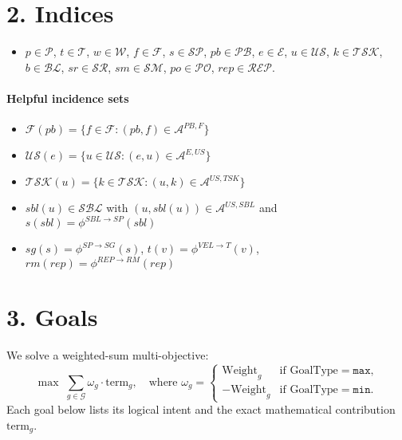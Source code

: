 \documentclass[11pt,a4paper]{article}
\begin{document}
\section{2. Indices}
\begin{itemize}[leftmargin=2.2em]
  \item $p\in\mathcal{P}$, $t\in\mathcal{T}$, $w\in\mathcal{W}$, $f\in\mathcal{F}$, $s\in\mathcal{SP}$, $pb\in\mathcal{PB}$, $e\in\mathcal{E}$, $u\in\mathcal{US}$, $k\in\mathcal{TSK}$, $b\in\mathcal{BL}$, $sr\in\mathcal{SR}$, $sm\in\mathcal{SM}$, $po\in\mathcal{PO}$, $rep\in\mathcal{REP}$.
\end{itemize}

\paragraph{Helpful incidence sets}
\begin{itemize}[leftmargin=2.2em]
  \item $\mathcal{F}(pb)=\{f\in\mathcal{F}:(pb,f)\in\mathcal{A}^{PB,F}\}$
  \item $\mathcal{US}(e)=\{u\in\mathcal{US}:(e,u)\in\mathcal{A}^{E,US}\}$
  \item $\mathcal{TSK}(u)=\{k\in\mathcal{TSK}:(u,k)\in\mathcal{A}^{US,TSK}\}$
  \item $sbl(u)\in\mathcal{SBL}$ with $(u,sbl(u))\in\mathcal{A}^{US,SBL}$ and $s(sbl)=\phi^{SBL\to SP}(sbl)$
  \item $sg(s)=\phi^{SP\to SG}(s)$, $t(v)=\phi^{VEL\to T}(v)$, $rm(rep)=\phi^{REP\to RM}(rep)$
\end{itemize}

\section{3. Goals}
We solve a weighted-sum multi-objective:
\[
\max\; \sum_{g\in\mathcal{G}} \omega_g \cdot \text{term}_g,\quad 
\text{where } 
\omega_g = 
\begin{cases}
\text{Weight}_g & \text{if GoalType}=\texttt{max},\\
-\text{Weight}_g & \text{if GoalType}=\texttt{min}.
\end{cases}
\]
Each goal below lists its logical intent and the exact mathematical contribution $\text{term}_g$.
\end{document}
